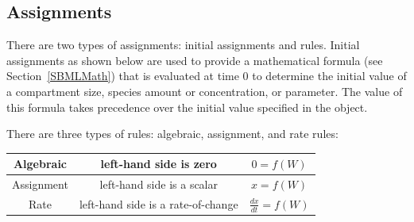 \documentclass[titlepage,11pt]{article}
\begin{document}




\subsection{\label{Assignments}Assignments}

\noindent
There are two types of assignments: initial assignments and rules.  Initial assignments as shown below are used to provide a mathematical formula (see Section~\ref{SBMLMath}) that is evaluated at time 0 to determine the initial value of a compartment size, species amount or concentration, or parameter.  The value of this formula takes precedence over the initial value specified in the object.  

\noindent
There are three types of rules: algebraic, assignment, and rate rules:
\begin{center}
\begin{tabular}{|c|c|c|}
\hline
Algebraic  & left-hand side is zero             & $0 = f(W)$ \\ \hline
Assignment & left-hand side is a scalar         & $x = f(W)$ \\ \hline
Rate       & left-hand side is a rate-of-change & $\frac{dx}{dt} = f(W)$ 
\\ \hline
\end{tabular}
\end{center}
\end{document}

